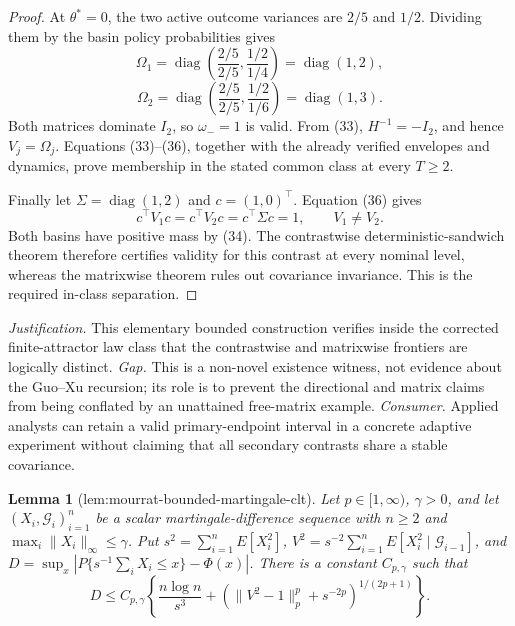 \documentclass{article}
\newtheorem{lemma}{Lemma}
\begin{document}
\begin{proof}
At \(\theta^*=0\), the two active outcome variances are \(2/5\) and \(1/2\).  Dividing them by the basin policy probabilities gives
\[
 \Omega_1=\operatorname{diag}\!\left(\frac{2/5}{2/5},\frac{1/2}{1/4}\right)
 =\operatorname{diag}(1,2),
\]
\[
 \Omega_2=\operatorname{diag}\!\left(\frac{2/5}{2/5},\frac{1/2}{1/6}\right)
 =\operatorname{diag}(1,3).                                               \tag{36}
\]
Both matrices dominate \(I_2\), so \(\omega_-=1\) is valid.  From (33), \(H^{-1}=-I_2\), and hence \(V_j=\Omega_j\).  Equations (33)--(36), together with the already verified envelopes and dynamics, prove membership in the stated common class at every \(T\ge2\).

Finally let \(\Sigma=\operatorname{diag}(1,2)\) and \(c=(1,0)^\top\).  Equation (36) gives
\[
 c^\top V_1c=c^\top V_2c=c^\top\Sigma c=1,
 \qquad V_1\ne V_2.
\]
Both basins have positive mass by (34).  The contrastwise deterministic-sandwich theorem therefore certifies validity for this contrast at every nominal level, whereas the matrixwise theorem rules out covariance invariance.  This is the required in-class separation.
\end{proof}
\par\smallskip\noindent \textit{Justification.} This elementary bounded construction verifies inside the corrected finite-attractor law class that the contrastwise and matrixwise frontiers are logically distinct. \textit{Gap.} This is a non-novel existence witness, not evidence about the Guo--Xu recursion; its role is to prevent the directional and matrix claims from being conflated by an unattained free-matrix example. \textit{Consumer.} Applied analysts can retain a valid primary-endpoint interval in a concrete adaptive experiment without claiming that all secondary contrasts share a stable covariance.

\begin{lemma}[lem:mourrat-bounded-martingale-clt]\label{lem:mourrat-bounded-martingale-clt}
Let \(p\in[1,\infty)\), \(\gamma>0\), and let \((X_i,\mathcal G_i)_{i=1}^n\) be a scalar martingale-difference sequence with \(n\ge2\) and \(\max_i\|X_i\|_\infty\le\gamma\). Put \(s^2=\sum_{i=1}^nE[X_i^2]\), \(V^2=s^{-2}\sum_{i=1}^nE[X_i^2\mid\mathcal G_{i-1}]\), and \(D=\sup_x|P\{s^{-1}\sum_iX_i\le x\}-\Phi(x)|\). There is a constant \(C_{p,\gamma}\) such that
\[
D\le C_{p,\gamma}\left\{\frac{n\log n}{s^3}+\left(\|V^2-1\|_p^p+s^{-2p}\right)^{1/(2p+1)}\right\}.
\]
\end{lemma}
\end{document}
